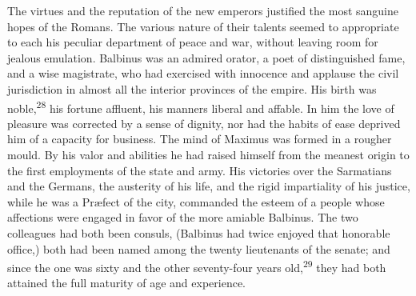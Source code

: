 The virtues and the reputation of the new emperors justified the
most sanguine hopes of the Romans. The various nature of their
talents seemed to appropriate to each his peculiar department of
peace and war, without leaving room for jealous emulation.
Balbinus was an admired orator, a poet of distinguished fame, and
a wise magistrate, who had exercised with innocence and applause
the civil jurisdiction in almost all the interior provinces of
the empire. His birth was noble,\textsuperscript{28} his fortune affluent, his
manners liberal and affable. In him the love of pleasure was
corrected by a sense of dignity, nor had the habits of ease
deprived him of a capacity for business. The mind of Maximus was
formed in a rougher mould. By his valor and abilities he had
raised himself from the meanest origin to the first employments
of the state and army. His victories over the Sarmatians and the
Germans, the austerity of his life, and the rigid impartiality of
his justice, while he was a Præfect of the city, commanded the
esteem of a people whose affections were engaged in favor of the
more amiable Balbinus. The two colleagues had both been consuls,
(Balbinus had twice enjoyed that honorable office,) both had been
named among the twenty lieutenants of the senate; and since the
one was sixty and the other seventy-four years old,\textsuperscript{29} they had
both attained the full maturity of age and experience.



